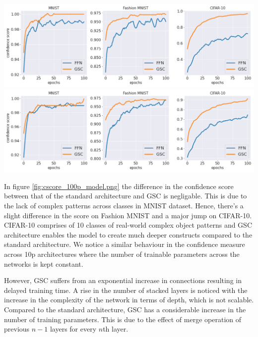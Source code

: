 \documentclass{article}
\begin{document}
\noindent\begin{minipage}{.5\textwidth}
   \centering
   \includegraphics[scale=0.2]{paper/cscore_100p_param.png}
   \label{fig:cscore_100p_model.png}
   \centering
   \includegraphics[scale=0.2]{paper/cscore_10p_param.png}
   \label{fig:cscore_10p_model.png}
\end{minipage}
\begin{minipage}{.4\textwidth}
In figure \ref{fig:cscore_100p_model.png} the difference in the confidence score between that of the standard architecture and GSC is negligable. This is due to the lack of complex patterns across classes in MNIST dataset. Hence, there's a slight difference in the score on Fashion MNIST and a major jump on CIFAR-10. CIFAR-10 comprises of 10 classes of real-world complex object patterns and GSC architecture enables the model to create much deeper constructs compared to the standard architecture. We notice a similar behaviour in the confidence measure across 10p architectures where the number of trainable parameters across the networks is kept constant.
\end{minipage}


However, GSC suffers from an exponential increase in connections resulting in delayed training time. A rise in the number of stacked layers is noticed with the increase in the complexity of the network in terms of depth, which is not scalable. Compared to the standard architecture, GSC has a considerable increase in the number of training parameters. This is due to the effect of merge operation of previous $n-1$ layers for every $n$th layer.
\end{document}
